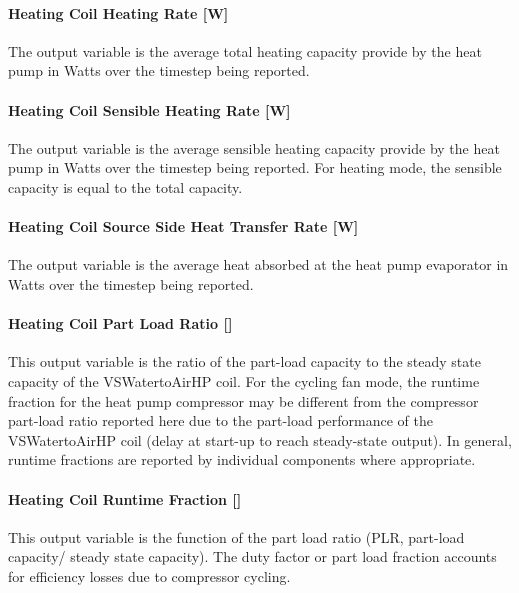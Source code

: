 \paragraph{Heating Coil Heating Rate {[}W{]}}\label{heating-coil-heating-rate-w-4}

The output variable is the average total heating capacity provide by the heat pump in Watts over the timestep being reported.

\paragraph{Heating Coil Sensible Heating Rate {[}W{]}}\label{heating-coil-sensible-heating-rate-w-2}

The output variable is the average sensible heating capacity provide by the heat pump in Watts over the timestep being reported. For heating mode, the sensible capacity is equal to the total capacity.

\paragraph{Heating Coil Source Side Heat Transfer Rate {[}W{]}}\label{heating-coil-source-side-heat-transfer-rate-w-2}

The output variable is the average heat absorbed at the heat pump evaporator in Watts over the timestep being reported.

\paragraph{Heating Coil Part Load Ratio {[]}}\label{heating-coil-part-load-ratio-2}

This output variable is the ratio of the part-load capacity to the steady state capacity of the VSWatertoAirHP coil. For the cycling fan mode, the runtime fraction for the heat pump compressor may be different from the compressor part-load ratio reported here due to the part-load performance of the VSWatertoAirHP coil (delay at start-up to reach steady-state output). In general, runtime fractions are reported by individual components where appropriate.

\paragraph{Heating Coil Runtime Fraction {[]}}\label{heating-coil-runtime-fraction-8}

This output variable is the function of the part load ratio (PLR, part-load capacity/ steady state capacity). The duty factor or part load fraction accounts for efficiency losses due to compressor cycling.

